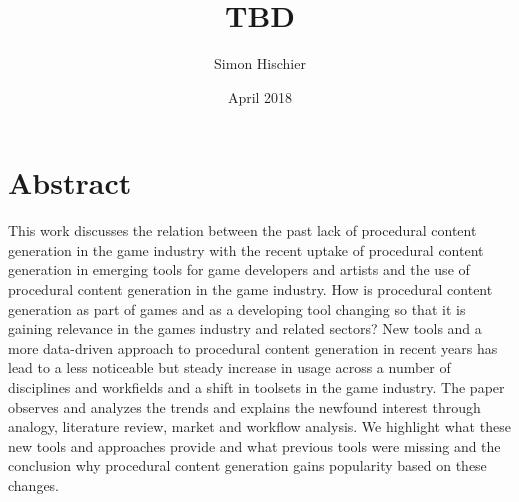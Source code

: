 \documentclass[10pt,a4paper]{article}
\title{TBD}
\author{Simon Hischier}
\date{April 2018}
\begin{document}



\renewcommand{\contentsname}{Inhalt}
\tableofcontents
\newpage

\section{Abstract}
\label{sec:abstract}
\begin{multicols}{2}
This work discusses the relation between the past lack of procedural content generation in the game industry with the recent uptake of procedural content generation in emerging tools for game developers and artists and the use of procedural content generation in the game industry. How is procedural content generation as part of games and as a developing tool changing so that it is gaining relevance in the games industry and related sectors? New tools and a more data-driven approach to procedural content generation in recent years has lead to a less noticeable but steady increase in usage across a number of disciplines and workfields and a shift in toolsets in the game industry. The paper observes and analyzes the trends and explains the newfound interest through analogy, literature review, market and workflow analysis. We highlight what these new tools and approaches provide and what previous tools were missing and the conclusion why procedural content generation gains popularity based on these changes.
\end{multicols}
\end{document}
